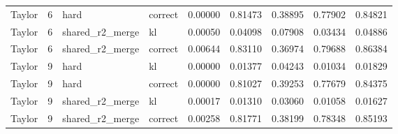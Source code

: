 \begin{tabular}{lrllrrrrr}
Taylor & 6 & hard & correct & 0.00000 & 0.81473 & 0.38895 & 0.77902 & 0.84821 \\
Taylor & 6 & shared_r2_merge & kl & 0.00050 & 0.04098 & 0.07908 & 0.03434 & 0.04886 \\
Taylor & 6 & shared_r2_merge & correct & 0.00644 & 0.83110 & 0.36974 & 0.79688 & 0.86384 \\
Taylor & 9 & hard & kl & 0.00000 & 0.01377 & 0.04243 & 0.01034 & 0.01829 \\
Taylor & 9 & hard & correct & 0.00000 & 0.81027 & 0.39253 & 0.77679 & 0.84375 \\
Taylor & 9 & shared_r2_merge & kl & 0.00017 & 0.01310 & 0.03060 & 0.01058 & 0.01627 \\
Taylor & 9 & shared_r2_merge & correct & 0.00258 & 0.81771 & 0.38199 & 0.78348 & 0.85193 \\
\bottomrule
\end{tabular}
